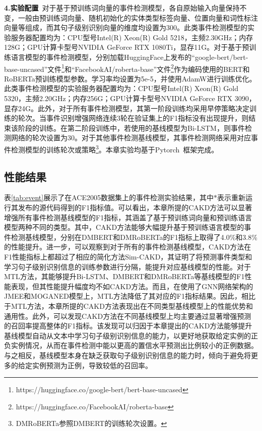 \textbf{4.实验配置}~对于基于预训练词向量的事件检测模型，各自原始输入向量保持不变，一般由预训练词向量、随机初始化的实体类型标签向量、位置向量和词性标注向量等组成，而其句子级别识别向量的维度均设置为300。此类事件检测模型的实验服务器配置均为：CPU型号Intel(R) Xeon(R) Gold 5218，主频2.30GHz；内存128G；GPU计算卡型号NVIDIA GeForce RTX 1080Ti，显存11G。对于基于预训练语言模型的事件检测模型，分别加载HuggingFace上发布的“google-bert/bert-base-uncased”文件\footnote{https://huggingface.co/google-bert/bert-base-uncased}和“FacebookAI/roberta-base”文件\footnote{https://huggingface.co/FacebookAI/roberta-base}作为编码使用的BERT和RoBERTa预训练模型参数。学习率均设置为5e-5，并使用AdamW进行训练优化。此类事件检测模型的实验服务器配置均为：CPU型号Intel(R) Xeon(R) Gold 5320，主频2.20GHz；内存256G；GPU计算卡型号NVIDIA GeForce RTX 3090，显存24G。此外，对于所有事件检测模型，其第一阶段训练均采用早停策略决定训练的轮次。当事件识别增强网络连续3轮在验证集上的F1指标没有出现提升，则结束该阶段的训练。在第二阶段训练中，若使用的基线模型为Bi-LSTM，则事件检测网络的轮次设置为30。对于其他事件检测基线模型，其事件检测网络采用对应事件检测模型的训练轮次或策略\footnote{DMRoBERTa参照DMBERT的训练轮次设置。}。本章实验均基于Pytorch~\cite{paszke2017automatic}框架完成。

\subsection{性能结果}
\label{3_3_2}

表\ref{tab:event}展示了在ACE2005数据集上的事件检测实验结果，其中$*$表示重新运行其发布的源代码得到的F1指标值。可以看出，本章所提的CAKD方法可以显著增强所有事件检测基线模型的F1指标，其涵盖了基于预训练词向量和预训练语言模型两种不同的类型。其中，CAKD方法能够大幅提升基于预训练语言模型的事件检测基线模型，分别在DMBERT和DMRoBERTa的F1指标上取得了4.0\%和3.8\%的性能提升。进一步，可以观察到对于所有的事件检测基线模型，CAKD方法在F1性能指标上都超过了相应的简化方法Sim-CAKD，其证明了将预测事件类型和学习句子级别识别信息的训练参数进行分隔，能提升对应基线模型的性能。对于MTL方法，其能够提升Bi-LSTM、DMBERT和DMRoBERTa等基线模型的F1性能表现，但其性能提升幅度均不如CAKD方法。而且，在使用了GNN网络架构的JMEE和MOGANED模型上，MTL方法降低了其对应的F1指标结果。因此，相比于MTL方法，本章所提的CAKD方法表现出在不同类型基线模型上的性能优势和通用性。此外，可以发现CAKD方法在不同基线模型上均主要通过显著增强预测的召回率提高整体的F1指标。该发现可以归因于本章提出的CAKD方法能够提升基线模型自动从文本中学习句子级别识别信息的能力，以更好地获取给定实例的正负实例情况，从而在事件检测中能以更高的置信水平预测出比例较小的正例数据。与之相反，基线模型本身在缺乏获取句子级别识别信息的能力时，倾向于避免将更多的给定实例预测为正例，导致较低的召回率。

